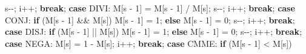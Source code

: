 \documentclass[
  brazilian,
  letterpaper,
]{book}
\newenvironment{Shaded}{\begin{snugshade}}{\end{snugshade}}
\newcommand{\ControlFlowTok}[1]{\textcolor[rgb]{0.00,0.23,0.31}{\textbf{#1}}}
\newcommand{\DecValTok}[1]{\textcolor[rgb]{0.68,0.00,0.00}{#1}}
\newcommand{\NormalTok}[1]{\textcolor[rgb]{0.00,0.23,0.31}{#1}}
\newcommand{\OperatorTok}[1]{\textcolor[rgb]{0.37,0.37,0.37}{#1}}
\theoremstyle{plain}
\theoremstyle{definition}
\theoremstyle{remark}
\begin{document}
\begin{Shaded}
\begin{Highlighting}[]
\NormalTok{            s}\OperatorTok{{-}{-};}
\NormalTok{            i}\OperatorTok{++;}
            \ControlFlowTok{break}\OperatorTok{;}
        \ControlFlowTok{case}\NormalTok{ DIVI}\OperatorTok{:}
\NormalTok{            M}\OperatorTok{[}\NormalTok{s }\OperatorTok{{-}} \DecValTok{1}\OperatorTok{]} \OperatorTok{=}\NormalTok{ M}\OperatorTok{[}\NormalTok{s }\OperatorTok{{-}} \DecValTok{1}\OperatorTok{]} \OperatorTok{/}\NormalTok{ M}\OperatorTok{[}\NormalTok{s}\OperatorTok{];}
\NormalTok{            s}\OperatorTok{{-}{-};}
\NormalTok{            i}\OperatorTok{++;}
            \ControlFlowTok{break}\OperatorTok{;}
        \ControlFlowTok{case}\NormalTok{ CONJ}\OperatorTok{:}
            \ControlFlowTok{if} \OperatorTok{(}\NormalTok{M}\OperatorTok{[}\NormalTok{s }\OperatorTok{{-}} \DecValTok{1}\OperatorTok{]} \OperatorTok{\&\&}\NormalTok{ M}\OperatorTok{[}\NormalTok{s}\OperatorTok{])}
\NormalTok{                M}\OperatorTok{[}\NormalTok{s }\OperatorTok{{-}} \DecValTok{1}\OperatorTok{]} \OperatorTok{=} \DecValTok{1}\OperatorTok{;}
            \ControlFlowTok{else}
\NormalTok{                M}\OperatorTok{[}\NormalTok{s }\OperatorTok{{-}} \DecValTok{1}\OperatorTok{]} \OperatorTok{=} \DecValTok{0}\OperatorTok{;}
\NormalTok{            s}\OperatorTok{{-}{-};}
\NormalTok{            i}\OperatorTok{++;}
            \ControlFlowTok{break}\OperatorTok{;}
        \ControlFlowTok{case}\NormalTok{ DISJ}\OperatorTok{:}
            \ControlFlowTok{if} \OperatorTok{(}\NormalTok{M}\OperatorTok{[}\NormalTok{s }\OperatorTok{{-}} \DecValTok{1}\OperatorTok{]} \OperatorTok{||}\NormalTok{ M}\OperatorTok{[}\NormalTok{s}\OperatorTok{])}
\NormalTok{                M}\OperatorTok{[}\NormalTok{s }\OperatorTok{{-}} \DecValTok{1}\OperatorTok{]} \OperatorTok{=} \DecValTok{1}\OperatorTok{;}
            \ControlFlowTok{else}
\NormalTok{                M}\OperatorTok{[}\NormalTok{s }\OperatorTok{{-}} \DecValTok{1}\OperatorTok{]} \OperatorTok{=} \DecValTok{0}\OperatorTok{;}
\NormalTok{            s}\OperatorTok{{-}{-};}
\NormalTok{            i}\OperatorTok{++;}
            \ControlFlowTok{break}\OperatorTok{;}
        \ControlFlowTok{case}\NormalTok{ NEGA}\OperatorTok{:}
\NormalTok{            M}\OperatorTok{[}\NormalTok{s}\OperatorTok{]} \OperatorTok{=} \DecValTok{1} \OperatorTok{{-}}\NormalTok{ M}\OperatorTok{[}\NormalTok{s}\OperatorTok{];}
\NormalTok{            i}\OperatorTok{++;}
            \ControlFlowTok{break}\OperatorTok{;}
        \ControlFlowTok{case}\NormalTok{ CMME}\OperatorTok{:}
            \ControlFlowTok{if} \OperatorTok{(}\NormalTok{M}\OperatorTok{[}\NormalTok{s }\OperatorTok{{-}} \DecValTok{1}\OperatorTok{]} \OperatorTok{\textless{}}\NormalTok{ M}\OperatorTok{[}\NormalTok{s}\OperatorTok{])}

\end{Highlighting}
\end{Shaded}
\end{document}
